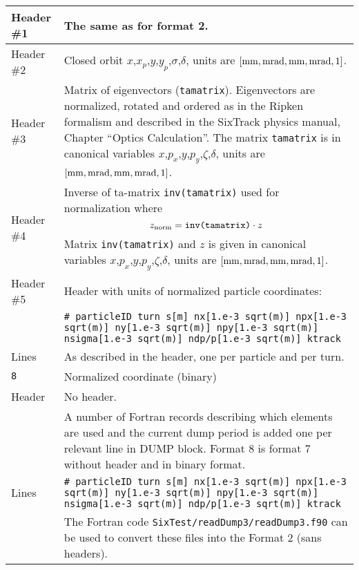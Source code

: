\begin{center}
\begin{longtable}{|p{1.8cm}|p{13.8cm}|}
        \hline
        Header \#1 & The same as for format 2.\\
        \hline
        Header \#2 & Closed orbit  $x$,$x_p$,$y$,$y_p$,$\sigma$,$\delta$, units are $[\rm mm,mrad,mm,mrad,1]$.\\
        \hline
        Header \#3 & Matrix of eigenvectors (\texttt{tamatrix}). Eigenvectors are normalized, rotated and ordered as in the Ripken formalism and described in the SixTrack physics manual, Chapter ``Optics Calculation''. The matrix \texttt{tamatrix} is in canonical variables $x$,$p_x$,$y$,$p_y$,$\zeta$,$\delta$, units are $[\rm mm,mrad,mm,mrad,1]$. \\
        \hline
        Header \#4 & Inverse of ta-matrix \texttt{inv(tamatrix)} used for normalization where
        \begin{equation}
            z_{\rm norm}=\texttt{inv(tamatrix)}\cdot z
        \end{equation}
        Matrix \texttt{inv(tamatrix)} and $z$ is given in canonical variables $x$,$p_x$,$y$,$p_y$,$\zeta$,$\delta$, units are $[\rm mm,mrad,mm,mrad,1]$.\\
        \hline
        Header \#5 & Header with units of normalized particle coordinates:\\
                   & \texttt{\# particleID turn s[m] nx[1.e-3 sqrt(m)] npx[1.e-3 sqrt(m)] ny[1.e-3 sqrt(m)] npy[1.e-3 sqrt(m)] nsigma[1.e-3 sqrt(m)] ndp/p[1.e-3 sqrt(m)] ktrack} \\
        \hline
        Lines      & As described in the header, one per particle and per turn.\\
        \hline
        \rowcolor{blue!15}
        \texttt{8} & Normalized coordinate (binary)\\
        \hline
        Header  & No header.\vspace{1mm} \\
                & A number of Fortran records describing which elements are used and the current dump period is added one per relevant line in DUMP block. Format 8 is format 7 without header and in binary format.\\
        \hline
        Lines   & \texttt{\# particleID turn s[m] nx[1.e-3 sqrt(m)] npx[1.e-3 sqrt(m)] ny[1.e-3 sqrt(m)] npy[1.e-3 sqrt(m)] nsigma[1.e-3 sqrt(m)] ndp/p[1.e-3 sqrt(m)] ktrack}\vspace{1mm} \\
                & The Fortran code \texttt{SixTest/readDump3/readDump3.f90} can be used to convert these files into the Format 2 (sans headers). \\

\end{longtable}
\end{center}
